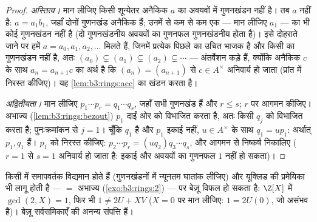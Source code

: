 \begin{proof}
\emph{अस्तित्व।} मान लीजिए किसी शून्येतर अनैकिक $a$ का
 अवयवों में गुणनखंडन नहीं है। तब $a$  नहीं है:
$a =
a_1b_1$, जहाँ दोनों गुणनखंड अनैकिक हैं; उनमें से कम से कम एक --- मान
लीजिए $a_1$ --- का भी कोई गुणनखंडन नहीं है (दो गुणनखंडनीय अवयवों
का गुणनफल गुणनखंडनीय होता है)। इसे दोहराते जाने पर हमें $a = a_0, a_1, a_2,
\dots$
मिलते हैं, जिनमें प्रत्येक पिछले का उचित भाजक है और किसी का
गुणनखंडन नहीं है, अतः $(a_0) \subsetneq (a_1) \subsetneq (a_2) \subsetneq \cdots$ --- अंतर्वेशन कड़े हैं, क्योंकि
अनैकिक $c$ के साथ $a_n = a_{n+1}c$ का अर्थ है कि $(a_n) = (a_{n+1})$ से $c \in A^\times$ अनिवार्य
हो जाता (प्रांत में निरस्त कीजिए)। यह \cref{lem:b3:rings:acc} का खंडन करता है।

\emph{अद्वितीयता।} मान लीजिए $p_1 \cdots p_r = q_1 \cdots q_s$, जहाँ सभी गुणनखंड  हैं
और $r \leq s$; $r$ पर आगमन कीजिए। अभाज्य (\cref{lem:b3:rings:bezout}) $p_1$ दाईं ओर को
विभाजित करता है, अतः किसी $q_j$ को विभाजित करता है; पुनःक्रमांकन
से $j = 1$। चूँकि $q_1$  है और $p_1$ इकाई नहीं, $u \in A^\times$ के
साथ $q_1 = u p_1$: अर्थात् $p_1,
q_1$  हैं। $p_1$ को निरस्त कीजिए:
$p_2 \cdots p_r = (u q_2)
q_3\cdots q_s$, और आगमन से निष्कर्ष निकालिए ($r = 1$ से $s = 1$ अनिवार्य हो
जाता है: इकाई और  अवयवों का गुणनफल $1$ नहीं हो सकता)।
\end{proof}

\begin{remark}\label{rem:b3:rings:ufdgcd}
किसी  में  समापवर्तक विद्यमान होते हैं (गुणनखंडनों में
न्यूनतम घातांक लीजिए) और यूक्लिड की प्रमेयिका भी लागू होती है ---
 $=$ अभाज्य (\cref{exo:b3:rings:2}) --- पर बेज़ू विफल हो सकता है:
$\Z[X]$ में $\gcd(2, X) = 1$, फिर भी $1 \neq 2U + XV$ ($X = 0$ पर मान लीजिए: $1 = 2U(0)$, जो
असंभव है)। बेज़ू सर्वसमिकाएँ  की अनन्य संपत्ति हैं।
\end{remark}

